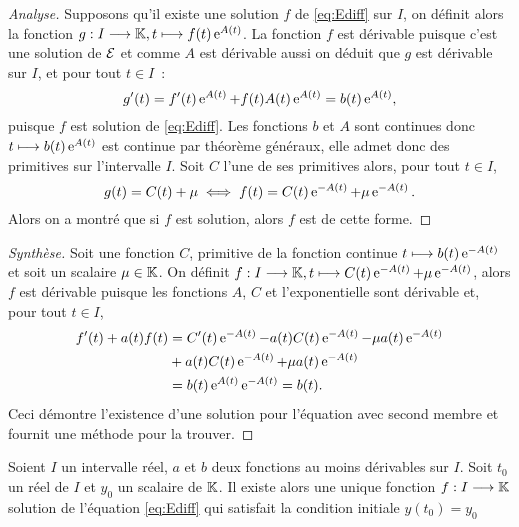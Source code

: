 \begin{proof}[Analyse]
  Supposons qu'il existe une solution \(f\) de \eqref{eq:Ediff} sur \(I\), on 
  définit alors la fonction \(g:I \longrightarrow \mathbb{K}, t \longmapsto f(t)\operatorname{e}^{A(t)}\). La 
  fonction \(f\) est dérivable puisque c'est une solution de \(\mathcal{E}\) et comme 
  \(A\) est dérivable aussi on déduit que \(g\) est dérivable sur \(I\), et 
  pour tout \(t \in I\)~:
  \begin{equation}
    g'(t) = f'(t)\operatorname{e}^{A(t)} + f(t)A(t)\operatorname{e}^{A(t)} = b(t)\operatorname{e}^{A(t)},
  \end{equation}
  puisque \(f\) est solution de \eqref{eq:Ediff}. Les fonctions \(b\) et \(A\) 
  sont continues donc \(t \longmapsto b(t)\operatorname{e}^{A(t)}\) est continue par 
  théorème généraux, elle admet donc des primitives sur l'intervalle \(I\). 
  Soit \(C\) l'une de ses primitives alors, pour tout \(t \in I\), 
  \begin{equation}
    g(t) = C(t) + \mu \iff f(t) = C(t)\operatorname{e}^{-A(t)} + \mu \operatorname{e}^{-A(t)}.
  \end{equation}
  Alors on a montré que si \(f\) est solution, alors \(f\) est de cette forme.
\end{proof}

\begin{proof}[Synthèse] 
  Soit une fonction \(C\), primitive de la fonction continue \(t \longmapsto 
  b(t)\operatorname{e}^{-A(t)}\) et soit un scalaire \(\mu \in \mathbb{K}\). On définit 
  \(f:I \longrightarrow \mathbb{K}, t \longmapsto C(t)\operatorname{e}^{-A(t)} + \mu \operatorname{e}^{-A(t)}\), alors \(f\) est 
  dérivable puisque les fonctions \(A\), \(C\) et l'exponentielle sont 
  dérivable et, pour tout \(t \in I\),
  \begin{align}
    f'(t) + a(t)f(t)& = C'(t) \operatorname{e}^{-A(t)} -a(t)C(t)\operatorname{e}^{-A(t)}-\mu a(t) \operatorname{e}^{-A(t)} 
    \notag \\ 
                    &+ a(t)C(t)\operatorname{e}^{-A(t)} + \mu a(t) \operatorname{e}^{-A(t)}\\
                    &= b(t) \operatorname{e}^{A(t)} \operatorname{e}^{-A(t)} = b(t).
  \end{align}
  Ceci démontre l'existence d'une solution pour l'équation avec second membre 
  et fournit une méthode pour la trouver.
\end{proof}

\begin{theo}
  \label{theo:4}
  Soient \(I\) un intervalle réel, \(a\) et \(b\) deux fonctions au moins 
  dérivables sur \(I\). Soit \(t_0\) un réel de \(I\) et \(y_0\) un scalaire 
  de \(\mathbb{K}\). Il existe alors une unique fonction \(f:I \longrightarrow \mathbb{K}\) 
  solution de l'équation \eqref{eq:Ediff} qui satisfait la condition initiale 
  \(y(t_0) = y_0\)
\end{theo}

